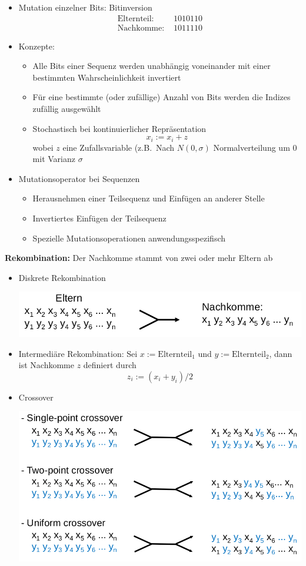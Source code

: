 \begin{itemize}
	\item Mutation einzelner Bits: Bitinversion
	\begin{align*}
		\text{Elternteil: } & 1010110 \\
		\text{Nachkomme: } & 1011110
	\end{align*}
	\item Konzepte:
	\begin{itemize}
		\item Alle Bits einer Sequenz werden unabhängig voneinander mit einer bestimmten Wahrscheinlichkeit invertiert
		\item Für eine bestimmte (oder zufällige) Anzahl von Bits werden die Indizes zufällig ausgewählt
		\item Stochastisch bei kontinuierlicher Repräsentation
		\begin{equation*}
			x_i := x_i + z
		\end{equation*}
		wobei $z$ eine Zufallsvariable  (z.B.\ Nach $N(0,\sigma)$ Normalverteilung um $0$ mit Varianz $\sigma$		
	\end{itemize}
	\item Mutationsoperator bei Sequenzen
	\begin{itemize}
		\item Herausnehmen einer Teilsequenz und Einfügen an anderer Stelle
		\item Invertiertes Einfügen der Teilsequenz
		\item Spezielle Mutationsoperationen  anwendungsspezifisch
	\end{itemize}
\end{itemize}
%
\textbf{Rekombination:} Der Nachkomme stammt von zwei oder mehr Eltern ab
\begin{itemize}
	\item Diskrete Rekombination
	\begin{center}
	\includegraphics[width=.6\textwidth]{figures/diskrete_rekombination.png}
	\end{center}
	\item Intermediäre Rekombination: Sei $x := \text{Elternteil}_1$ und $y := \text{Elternteil}_2$, dann ist Nachkomme $z$ definiert durch
	\begin{equation*}
		z_i := (x_i + y_i) / 2
	\end{equation*}
	\item Crossover
	\begin{center}
	\includegraphics[width=.5\textwidth]{figures/crossover.png}	
	\end{center}
\end{itemize}

